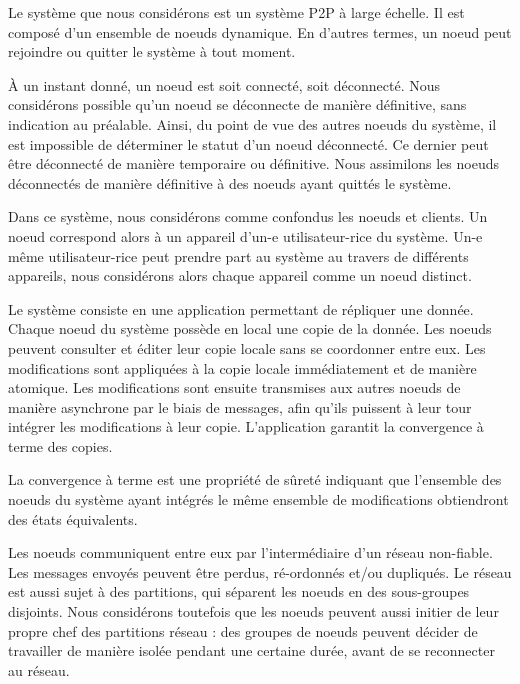 Le système que nous considérons est un système \acf{P2P} à large échelle.
Il est composé d'un ensemble de noeuds dynamique.
En d'autres termes, un noeud peut rejoindre ou quitter le système à tout moment.

À un instant donné, un noeud est soit connecté, soit déconnecté.
Nous considérons possible qu'un noeud se déconnecte de manière définitive, sans indication au préalable.
Ainsi, du point de vue des autres noeuds du système, il est impossible de déterminer le statut d'un noeud déconnecté.
Ce dernier peut être déconnecté de manière temporaire ou définitive.
Nous assimilons les noeuds déconnectés de manière définitive à des noeuds ayant quittés le système.

Dans ce système, nous considérons comme confondus les noeuds et clients.
Un noeud correspond alors à un appareil d'un-e utilisateur-rice du système.
Un-e même utilisateur-rice peut prendre part au système au travers de différents appareils, nous considérons alors chaque appareil comme un noeud distinct.

Le système consiste en une application permettant de répliquer une donnée.
Chaque noeud du système possède en local une copie de la donnée.
Les noeuds peuvent consulter et éditer leur copie locale sans se coordonner entre eux.
Les modifications sont appliquées à la copie locale immédiatement et de manière atomique.
Les modifications sont ensuite transmises aux autres noeuds de manière asynchrone par le biais de messages, afin qu'ils puissent à leur tour intégrer les modifications à leur copie.
L'application garantit la convergence à terme des copies.

\begin{definition}
    La convergence à terme est une propriété de sûreté indiquant que l'ensemble des noeuds du système ayant intégrés le même ensemble de modifications obtiendront des états équivalents\footnotemark.
\end{definition}

Les noeuds communiquent entre eux par l'intermédiaire d'un réseau non-fiable.
Les messages envoyés peuvent être perdus, ré-ordonnés et/ou dupliqués.
Le réseau est aussi sujet à des partitions, qui séparent les noeuds en des sous-groupes disjoints.
Nous considérons toutefois que les noeuds peuvent aussi initier de leur propre chef des partitions réseau : des groupes de noeuds peuvent décider de travailler de manière isolée pendant une certaine durée, avant de se reconnecter au réseau.

